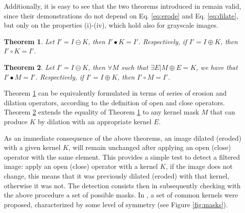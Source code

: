 \documentclass{ieeeaccess}
\newtheorem{theorem}{Theorem}
\begin{document}
Additionally, it is easy to see that the two theorems introduced in \cite{de2017detecting} remain valid, since their demonstrations do not depend on Eq. \ref{eq:erode} and Eq. \ref{eq:dilate}, but only on the properties (i)-(iv), which hold also for grayscale images.

\begin{theorem}
	\label{theorem_1}
	Let $I' = I \ominus K$, then $I'\bullet K = I'$. Respectively, if $I' = I \oplus K$, then $I'\circ K = I'$.
\end{theorem}

\begin{theorem}
	\label{theorem_2}
	Let $I' = I \ominus K$, then $\forall M$ such that $\exists E | M \oplus E = K$, we have that $I' \bullet M = I'$. Respectively, if $I' = I \oplus K$, then $I' \circ M = I'$.
\end{theorem}

Theorem \ref{theorem_1} can be equivalently formulated in terms of series of erosion and dilation operators, according to the definition of open and close operators. Theorem \ref{theorem_2} extends the equality of Theorem \ref{theorem_1} to any kernel mask $M$ that can produce $K$ by dilation with an appropriate kernel $E$.

As an immediate consequence of the above theorems, an image dilated (eroded) with a given kernel $K$, will remain unchanged after applying an open (close) operator with the same element. This provides a simple test to detect a filtered image: apply an open (close) operator with a kernel $K$, if the image does not change, this means that it was previously dilated (eroded) with that kernel, otherwise it was not. The detection consists then in subsequently checking with the above procedure a set of possible masks. In \cite{de2017detecting}, a set of common kernels were proposed, characterized by some level of symmetry (see Figure \ref{fig:masks}).
\end{document}
